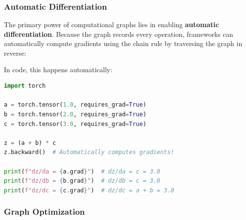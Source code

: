 \documentclass[11pt]{article}
\begin{document}
\subsubsection{Automatic Differentiation}

The primary power of computational graphs lies in enabling \textbf{automatic differentiation}. Because the graph records every operation, frameworks can automatically compute gradients using the chain rule by traversing the graph in reverse:

\begin{center}
\end{center}

In code, this happens automatically:
\begin{lstlisting}[language=Python, caption=Automatic differentiation in PyTorch]
import torch

a = torch.tensor(1.0, requires_grad=True)
b = torch.tensor(2.0, requires_grad=True)
c = torch.tensor(3.0, requires_grad=True)

z = (a + b) * c
z.backward()  # Automatically computes gradients!

print(f"dz/da = {a.grad}")  # dz/da = c = 3.0
print(f"dz/db = {b.grad}")  # dz/db = c = 3.0
print(f"dz/dc = {c.grad}")  # dz/dc = a + b = 3.0
\end{lstlisting}

\subsubsection{Graph Optimization}
\end{document}

